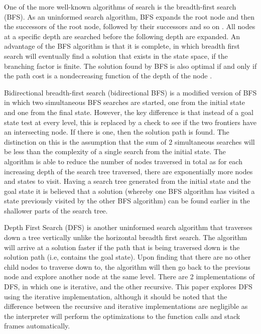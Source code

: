 \documentclass[conference]{IEEEtran}
\begin{document}
One of the more well-known algorithms of search is the breadth-first search (BFS). As an uninformed search algorithm, BFS expands the root node and then the successors of the root node, followed by their successors and so on \cite{Textbook01}. All nodes at a specific depth are searched before the following depth are expanded. An advantage of the BFS algorithm is that it is complete, in which breadth first search will eventually find a solution that exists in the state space, if the branching factor is finite. The solution found by BFS is also optimal if and only if the path cost is a nondecreasing function of the depth of the node \cite{Textbook01}.

Bidirectional breadth-first search (bidirectional BFS) is a modified version of BFS in which two simultaneous BFS searches are started, one from the initial state and one from the final state. However, the key difference is that instead of a goal state test at every level, this is replaced by a check to see if the two frontiers have an intersecting node. If there is one, then the solution path is found. The distinction on this is the assumption that the sum of 2 simultaneous searches will be less than the complexity of a single search from the initial state. The algorithm is able to reduce the number of nodes traversed in total as for each increasing depth of the search tree traversed, there are exponentially more nodes and states to visit. Having a search tree generated from the initial state and the goal state it is believed that a solution (whereby one BFS algorithm has visited a state previously visited by the other BFS algorithm) can be found earlier in the shallower parts of the search tree.

Depth First Search (DFS) is another uninformed search algorithm that traverses down a tree vertically unlike the horizontal breadth first search. The algorithm will arrive at a solution faster if the path that is being traversed down is the solution path (i.e, contains the goal state). Upon finding that there are no other child nodes to traverse down to, the algorithm will then go back to the previous node and explore another node at the same level. There are 2 implementations of DFS, in which one is iterative, and the other recursive. This paper explores DFS using the iterative implementation, although it should be noted that the difference between the recursive and iterative implementations are negligible as the interpreter will perform the optimizations to the function calls and stack frames automatically.
\end{document}
